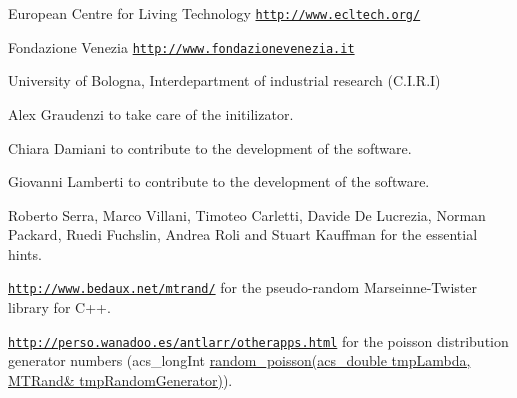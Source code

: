 \begin{DoxyItemize}
\item European Centre for Living Technology \href{http://www.ecltech.org/}{\tt http\+://www.\+ecltech.\+org/}
\item Fondazione Venezia \href{http://www.fondazionevenezia.it}{\tt http\+://www.\+fondazionevenezia.\+it}
\item University of Bologna, Interdepartment of industrial research (C.\+I.\+R.\+I)
\item Alex Graudenzi to take care of the initilizator.
\item Chiara Damiani to contribute to the development of the software.
\item Giovanni Lamberti to contribute to the development of the software.
\item Roberto Serra, Marco Villani, Timoteo Carletti, Davide De Lucrezia, Norman Packard, Ruedi Fuchslin, Andrea Roli and Stuart Kauffman for the essential hints.
\item \href{http://www.bedaux.net/mtrand/}{\tt http\+://www.\+bedaux.\+net/mtrand/} for the pseudo-\/random Marseinne-\/\+Twister library for C++.
\item \href{http://perso.wanadoo.es/antlarr/otherapps.html}{\tt http\+://perso.\+wanadoo.\+es/antlarr/otherapps.\+html} for the poisson distribution generator numbers (acs\+\_\+long\+Int \hyperlink{a00059_a22cddb6ffcf2250e0c90bc913728350f}{random\+\_\+poisson(acs\+\_\+double tmp\+Lambda, M\+T\+Rand\& tmp\+Random\+Generator)}). 
\end{DoxyItemize}